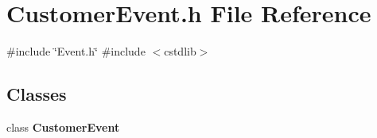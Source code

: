 \section{Customer\+Event.\+h File Reference}
\label{CustomerEvent_8h}
{\ttfamily \#include \char`\"{}Event.\+h\char`\"{}}\newline
{\ttfamily \#include $<$cstdlib$>$}\newline
\subsection*{Classes}
\begin{DoxyCompactItemize}
\item 
class \textbf{ Customer\+Event}
\end{DoxyCompactItemize}
